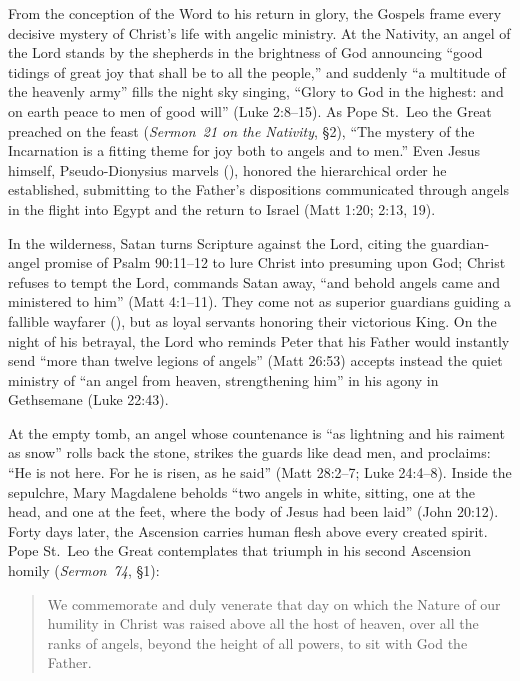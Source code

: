 From the conception of the Word to his return in glory, the Gospels frame every decisive mystery of Christ's life with angelic ministry. At the Nativity, an angel of the Lord stands by the shepherds in the brightness of God announcing ``good tidings of great joy that shall be to all the people,'' and suddenly ``a multitude of the heavenly army'' fills the night sky singing, ``Glory to God in the highest: and on earth peace to men of good will'' (Luke 2:8--15). As Pope St.~Leo the Great preached on the feast (\emph{Sermon~21 on the Nativity}, \S2), ``The mystery of the Incarnation is a fitting theme for joy both to angels and to men.'' Even Jesus himself, Pseudo-Dionysius marvels (), honored the hierarchical order he established, submitting to the Father's dispositions communicated through angels in the flight into Egypt and the return to Israel (Matt 1:20; 2:13, 19).

In the wilderness, Satan turns Scripture against the Lord, citing the guardian-angel promise of Psalm 90:11--12 to lure Christ into presuming upon God; Christ refuses to tempt the Lord, commands Satan away, ``and behold angels came and ministered to him'' (Matt 4:1--11). They come not as superior guardians guiding a fallible wayfarer (), but as loyal servants honoring their victorious King. On the night of his betrayal, the Lord who reminds Peter that his Father would instantly send ``more than twelve legions of angels'' (Matt 26:53) accepts instead the quiet ministry of ``an angel from heaven, strengthening him'' in his agony in Gethsemane (Luke 22:43).

At the empty tomb, an angel whose countenance is ``as lightning and his raiment as snow'' rolls back the stone, strikes the guards like dead men, and proclaims: ``He is not here. For he is risen, as he said'' (Matt 28:2--7; Luke 24:4--8). Inside the sepulchre, Mary Magdalene beholds ``two angels in white, sitting, one at the head, and one at the feet, where the body of Jesus had been laid'' (John 20:12). Forty days later, the Ascension carries human flesh above every created spirit. Pope St.~Leo the Great contemplates that triumph in his second Ascension homily (\emph{Sermon~74}, \S1):

\begin{quotation}
We commemorate and duly venerate that day on which the Nature of our humility in Christ was raised above all the host of heaven, over all the ranks of angels, beyond the height of all powers, to sit with God the Father.
\end{quotation}

